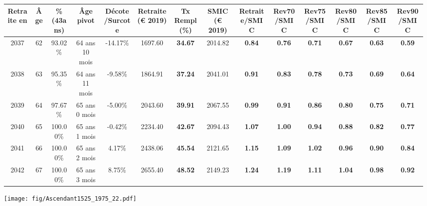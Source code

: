 \begin{adjustbox}{max width=\textwidth} 
\begin{tabular}[htb]{|c|c||c|c|c||c|c||c||c|c|c|c|c|c|} 
\hline 
 Retraite en &  Âge &  \%(43ans) &  Âge pivot &  Décote/Surcote &  Retraite (\euro{} 2019) &  Tx Rempl(\%) &  SMIC (\euro{} 2019) &  Retraite/SMIC &  Rev70/SMIC &  Rev75/SMIC &  Rev80/SMIC &  Rev85/SMIC &  Rev90/SMIC \\ 
\hline \hline 
 2037 &  62 &  93.02\% &  64 ans 10 mois &  -14.17\% &  1697.60 &  {\bf 34.67} &  2014.82 &  {\bf {\color{red} 0.84}} &  {\bf {\color{red} 0.76}} &  {\bf {\color{red} 0.71}} &  {\bf {\color{red} 0.67}} &  {\bf {\color{red} 0.63}} &  {\bf {\color{red} 0.59}} \\ 
\hline 
 2038 &  63 &  95.35\% &  64 ans 11 mois &  -9.58\% &  1864.91 &  {\bf 37.24} &  2041.01 &  {\bf {\color{red} 0.91}} &  {\bf {\color{red} 0.83}} &  {\bf {\color{red} 0.78}} &  {\bf {\color{red} 0.73}} &  {\bf {\color{red} 0.69}} &  {\bf {\color{red} 0.64}} \\ 
\hline 
 2039 &  64 &  97.67\% &  65 ans 0 mois &  -5.00\% &  2043.60 &  {\bf 39.91} &  2067.55 &  {\bf {\color{red} 0.99}} &  {\bf {\color{red} 0.91}} &  {\bf {\color{red} 0.86}} &  {\bf {\color{red} 0.80}} &  {\bf {\color{red} 0.75}} &  {\bf {\color{red} 0.71}} \\ 
\hline 
 2040 &  65 &  100.00\% &  65 ans 1 mois &  -0.42\% &  2234.40 &  {\bf 42.67} &  2094.43 &  {\bf 1.07} &  {\bf 1.00} &  {\bf {\color{red} 0.94}} &  {\bf {\color{red} 0.88}} &  {\bf {\color{red} 0.82}} &  {\bf {\color{red} 0.77}} \\ 
\hline 
 2041 &  66 &  100.00\% &  65 ans 2 mois &  4.17\% &  2438.06 &  {\bf 45.54} &  2121.65 &  {\bf 1.15} &  {\bf 1.09} &  {\bf 1.02} &  {\bf {\color{red} 0.96}} &  {\bf {\color{red} 0.90}} &  {\bf {\color{red} 0.84}} \\ 
\hline 
 2042 &  67 &  100.00\% &  65 ans 3 mois &  8.75\% &  2655.40 &  {\bf 48.52} &  2149.23 &  {\bf 1.24} &  {\bf 1.19} &  {\bf 1.11} &  {\bf 1.04} &  {\bf {\color{red} 0.98}} &  {\bf {\color{red} 0.92}} \\ 
\hline 
\hline 
\end{tabular} 
\end{adjustbox} 
 
 \vspace{0.1cm} 

 \begin{center}\texttt{[image: fig/Ascendant1525\_1975\_22.pdf]}\end{center} \label{fig/Ascendant1525_1975_22.pdf} 

